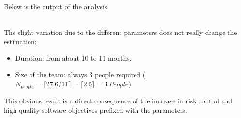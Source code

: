 \documentclass[a4paper,11pt]{report} %
\begin{document}
			\pagebreak\\
			Below is the output of the analysis.\bigskip\\
			\begin{minipage}{\linewidth}
			\end{minipage}
			\bigskip\\
			The slight variation due to the different parameters does not really change the estimation:
			\begin{itemize}
				\item Duration: from about 10 to 11 months.
				\item Size of the team: always 3 people required  (\(N_{people} = \lceil 27.6 / 11 \rceil = \lceil 2.5 \rceil = 3 \ People\))
			\end{itemize}
			\bigskip
			This obvious result is a direct consequence of the increase in risk control and high-quality-software objectives prefixed with the parameters.
			
	\pagebreak
\end{document}
